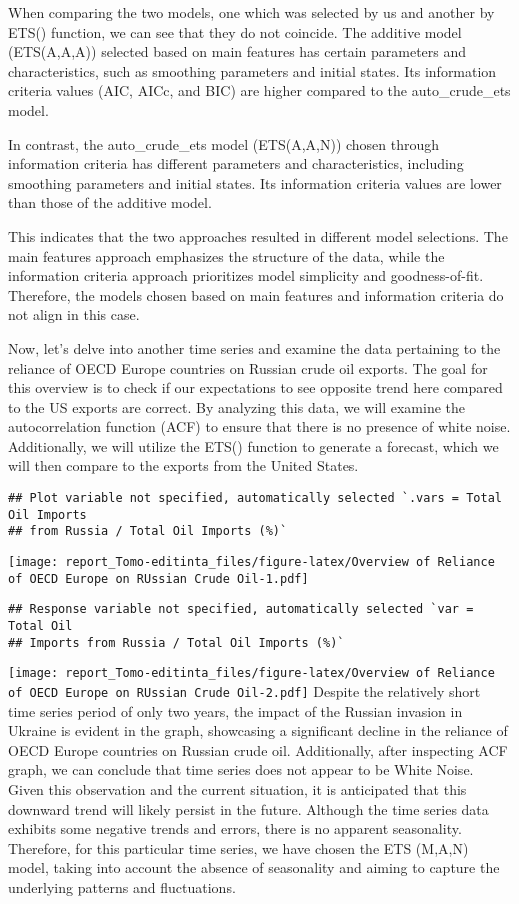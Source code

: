 \documentclass[
]{article}
\begin{document}
When comparing the two models, one which was selected by us and another
by ETS() function, we can see that they do not coincide. The additive
model (ETS(A,A,A)) selected based on main features has certain
parameters and characteristics, such as smoothing parameters and initial
states. Its information criteria values (AIC, AICc, and BIC) are higher
compared to the auto\_crude\_ets model.

In contrast, the auto\_crude\_ets model (ETS(A,A,N)) chosen through
information criteria has different parameters and characteristics,
including smoothing parameters and initial states. Its information
criteria values are lower than those of the additive model.

This indicates that the two approaches resulted in different model
selections. The main features approach emphasizes the structure of the
data, while the information criteria approach prioritizes model
simplicity and goodness-of-fit. Therefore, the models chosen based on
main features and information criteria do not align in this case.

Now, let's delve into another time series and examine the data
pertaining to the reliance of OECD Europe countries on Russian crude oil
exports. The goal for this overview is to check if our expectations to
see opposite trend here compared to the US exports are correct. By
analyzing this data, we will examine the autocorrelation function (ACF)
to ensure that there is no presence of white noise. Additionally, we
will utilize the ETS() function to generate a forecast, which we will
then compare to the exports from the United States.

\begin{verbatim}
## Plot variable not specified, automatically selected `.vars = Total Oil Imports
## from Russia / Total Oil Imports (%)`
\end{verbatim}

\texttt{[image: report\_Tomo-editinta\_files/figure-latex/Overview of Reliance of OECD Europe on RUssian Crude Oil-1.pdf]}

\begin{verbatim}
## Response variable not specified, automatically selected `var = Total Oil
## Imports from Russia / Total Oil Imports (%)`
\end{verbatim}

\texttt{[image: report\_Tomo-editinta\_files/figure-latex/Overview of Reliance of OECD Europe on RUssian Crude Oil-2.pdf]}
Despite the relatively short time series period of only two years, the
impact of the Russian invasion in Ukraine is evident in the graph,
showcasing a significant decline in the reliance of OECD Europe
countries on Russian crude oil. Additionally, after inspecting ACF
graph, we can conclude that time series does not appear to be White
Noise. Given this observation and the current situation, it is
anticipated that this downward trend will likely persist in the future.
Although the time series data exhibits some negative trends and errors,
there is no apparent seasonality. Therefore, for this particular time
series, we have chosen the ETS (M,A,N) model, taking into account the
absence of seasonality and aiming to capture the underlying patterns and
fluctuations.
\end{document}
